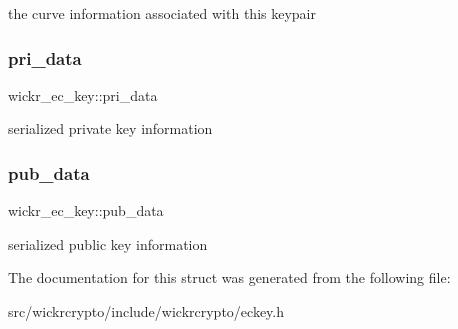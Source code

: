 the curve information associated with this keypair \mbox{\label{structwickr__ec__key_a67c23110b722401c6ba8b883b3aa74fc}} 
\subsubsection{\texorpdfstring{pri\+\_\+data}{pri\_data}}
{\footnotesize\ttfamily wickr\+\_\+ec\+\_\+key\+::pri\+\_\+data}

serialized private key information \mbox{\label{structwickr__ec__key_af972d3c8b571df0ef009ebf079705e82}} 
\subsubsection{\texorpdfstring{pub\+\_\+data}{pub\_data}}
{\footnotesize\ttfamily wickr\+\_\+ec\+\_\+key\+::pub\+\_\+data}

serialized public key information 

The documentation for this struct was generated from the following file\+:\begin{DoxyCompactItemize}
\item 
src/wickrcrypto/include/wickrcrypto/eckey.\+h\end{DoxyCompactItemize}
